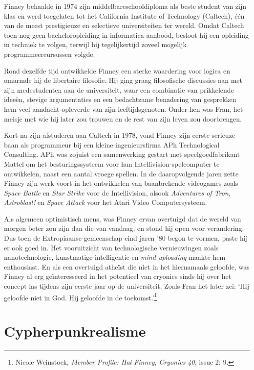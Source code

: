 \documentclass[
  a5paper,
  smalldemyvopaper,11pt,twoside,onecolumn,openright,extrafontsizes,
hidelinks]{memoir}
\begin{document}
Finney behaalde in 1974 zijn middelbareschooldiploma als beste student
van zijn klas en werd toegelaten tot het California Institute of
Technology (Caltech), één van de meest prestigieuze en selectieve
universiteiten ter wereld. Omdat Caltech toen nog geen bacheloropleiding
in informatica aanbood, besloot hij een opleiding in techniek te volgen,
terwijl hij tegelijkertijd zoveel mogelijk programmeercursussen volgde.

Rond dezelfde tijd ontwikkelde Finney een sterke waardering voor logica
en omarmde hij de libertaire filosofie. Hij ging graag filosofische
discussies aan met zijn medestudenten aan de universiteit, waar een
combinatie van prikkelende ideeën, stevige argumentaties en een
bedachtzame benadering van gesprekken hem veel aandacht opleverde van
zijn leeftijdsgenoten. Onder hen was Fran, het meisje met wie hij later
zou trouwen en de rest van zijn leven zou doorbrengen.

Kort na zijn afstuderen aan Caltech in 1978, vond Finney zijn eerste
serieuze baan als programmeur bij een kleine ingenieursfirma APh
Technological Consulting. APh was zojuist een samenwerking gestart met
speelgoedfabrikant Mattel om het besturingssysteem voor hun
Intellivision-spelcomputer te ontwikkelen, naast een aantal vroege
spellen. In de daaropvolgende jaren zette Finney zijn werk voort in het
ontwikkelen van baanbrekende videogames zoals \emph{Space Battle} en
\emph{Star Strike} voor de Intellivision, alsook \emph{Adventures of
Tron}, \emph{Astroblast!} en \emph{Space Attack} voor het Atari Video
Computersysteem.

Als algemeen optimistisch mens, was Finney ervan overtuigd dat de wereld
van morgen beter zou zijn dan die van vandaag, en stond hij open voor
verandering. Dus toen de Extropiaanse-gemeenschap eind jaren '80 begon
te vormen, paste hij er ook goed in. Het vooruitzicht van technologische
vernieuwingen zoals nanotechnologie, kunstmatige intelligentie en
\emph{mind uploading} maakte hem enthousiast. En als een overtuigd
atheïst die niet in het hiernamaals geloofde, was Finney al erg
geïnteresseerd in het potentieel van cryonics sinds hij over het concept
las tijdens zijn eerste jaar op de universiteit. Zoals Fran het later zei: `Hij geloofde niet in God. Hij geloofde in de
toekomst.'\footnote{Nicole Weinstock, \emph{Member Profile: Hal Finney},
  \emph{Cryonics 40}, issue 2: 9.}

\section{Cypherpunkrealisme}\label{cypherpunkrealisme}
\end{document}
